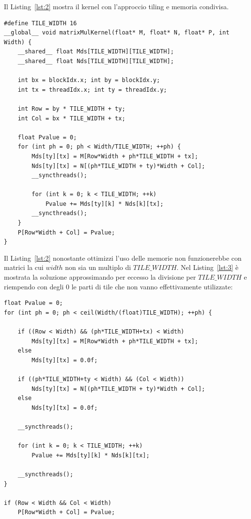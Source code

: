 \documentclass[a4paper]{article}
\begin{document}
Il Listing~\ref{lst:2} mostra il kernel con l'approccio tiling e memoria condivisa.

\begin{lstlisting}[caption={Kernel CUDA con tiling e memoria condivisa}, label={lst:2}]
#define TILE_WIDTH 16
__global__ void matrixMulKernel(float* M, float* N, float* P, int Width) {
    __shared__ float Mds[TILE_WIDTH][TILE_WIDTH];
    __shared__ float Nds[TILE_WIDTH][TILE_WIDTH];

    int bx = blockIdx.x; int by = blockIdx.y;
    int tx = threadIdx.x; int ty = threadIdx.y;

    int Row = by * TILE_WIDTH + ty;
    int Col = bx * TILE_WIDTH + tx;

    float Pvalue = 0;
    for (int ph = 0; ph < Width/TILE_WIDTH; ++ph) {
        Mds[ty][tx] = M[Row*Width + ph*TILE_WIDTH + tx];
        Nds[ty][tx] = N[(ph*TILE_WIDTH + ty)*Width + Col];
        __syncthreads();

        for (int k = 0; k < TILE_WIDTH; ++k)
            Pvalue += Mds[ty][k] * Nds[k][tx];
        __syncthreads();
    }
    P[Row*Width + Col] = Pvalue;
}
\end{lstlisting}

\newpage

Il Listing~\ref{lst:2} nonostante ottimizzi l'uso delle memorie non funzionerebbe con matrici la cui $width$ non sia un multiplo di $TILE\_WIDTH$. Nel Listing~\ref{lst:3} è mostrata la soluzione approssimando per eccesso la divisione per $TILE\_WIDTH$ e riempendo con degli $0$ le parti di tile che non vanno effettivamente utilizzate:

\begin{lstlisting}[caption={Kernel CUDA con gestione dei bordi e tiling}, label={lst:3}]
float Pvalue = 0;
for (int ph = 0; ph < ceil(Width/(float)TILE_WIDTH); ++ph) {

    if ((Row < Width) && (ph*TILE_WIDTH+tx) < Width)
        Mds[ty][tx] = M[Row*Width + ph*TILE_WIDTH + tx];
    else
        Mds[ty][tx] = 0.0f;

    if ((ph*TILE_WIDTH+ty < Width) && (Col < Width))
        Nds[ty][tx] = N[(ph*TILE_WIDTH + ty)*Width + Col];
    else
        Nds[ty][tx] = 0.0f;

    __syncthreads();

    for (int k = 0; k < TILE_WIDTH; ++k)
        Pvalue += Mds[ty][k] * Nds[k][tx];

    __syncthreads();
}

if (Row < Width && Col < Width)
    P[Row*Width + Col] = Pvalue;
\end{lstlisting}
\end{document}
